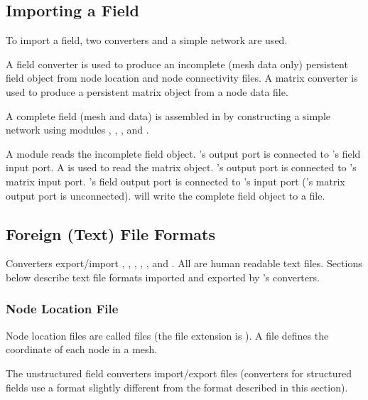 \subsection{Importing a Field}
\label{sec:import_field}

To import a field, two converters and a simple \sr{} network are used.

A field converter is used to produce an incomplete (mesh data only)
persistent field object from node location and node connectivity
files.  A matrix converter is used to produce a persistent matrix
object from a node data file.

A complete field (mesh and data) is assembled in \sr{} by
constructing a simple network using modules ,
,  , and
.

A  module reads the incomplete field object.
's output port is connected to
's field input port.  A
 is used to read the matrix object.
's output port is connected to
's matrix input port.
's field output port is connected to
's input port ('s
matrix output port is unconnected).   will write
the complete field object to a file.

\subsection{Foreign (Text) File Formats}

Converters export/import , , , , ,  and .
All are human readable text files.  Sections below describe text file
formats imported and exported by \sr{}'s converters.

\subsubsection{Node Location File}
\label{sec:node_loc_fmt}

Node location files are called  files (the file extension is
).  A  file defines the coordinate of
each node in a mesh.

The unstructured field converters import/export  files
(converters for structured fields use a  format slightly
different from the format described in this section).

